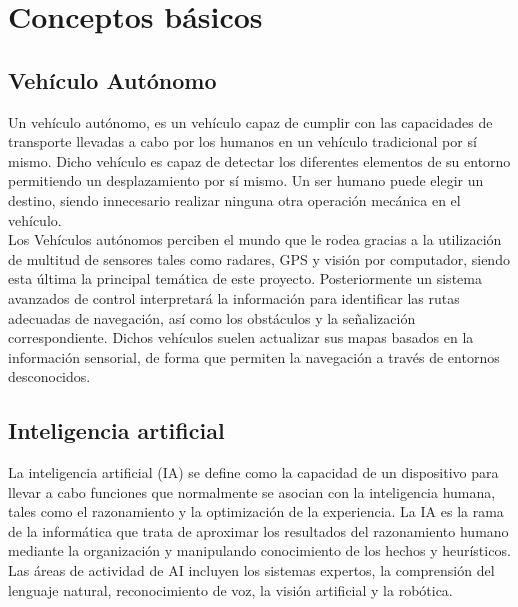 

\chapter{Conceptos básicos}
\label{chap:conceptos-básicos}

\section{Vehículo Autónomo}
\label{sec:def-vehículo-autónomo}

Un vehículo autónomo, es un vehículo capaz de cumplir con las capacidades de transporte llevadas a cabo por los humanos en un vehículo tradicional por sí mismo. Dicho vehículo es capaz de detectar los diferentes elementos de su entorno permitiendo un desplazamiento por sí mismo. Un ser humano puede elegir un destino, siendo innecesario realizar ninguna otra operación mecánica en el vehículo.\\

Los Vehículos autónomos perciben el mundo que le rodea gracias a la utilización de multitud de sensores tales como radares, GPS y visión por computador, siendo esta última la principal temática de este proyecto. Posteriormente un sistema avanzados de control interpretará la información para identificar las rutas adecuadas de navegación, así como los obstáculos y la señalización correspondiente. Dichos vehículos suelen actualizar sus mapas basados en la información sensorial, de forma que permiten la navegación a través de entornos desconocidos.

\section{Inteligencia artificial}   
\label{sec:def-inteligencia-artificial}

La inteligencia artificial (IA) se define como la capacidad de un dispositivo para llevar a cabo funciones que normalmente se asocian con la inteligencia humana, tales como el razonamiento y la optimización de la experiencia. La IA es la rama de la informática que trata de aproximar los resultados del razonamiento humano mediante la organización y manipulando conocimiento de los hechos y heurísticos. Las áreas de actividad de AI incluyen los sistemas expertos, la comprensión del lenguaje natural, reconocimiento de voz, la visión artificial y la robótica.

